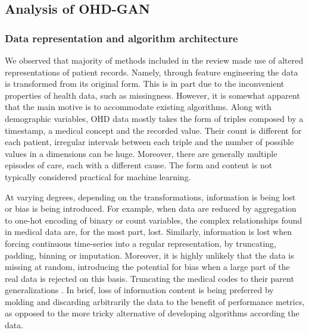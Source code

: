 \subsection{Analysis of OHD-GAN}
\subsubsection{Data representation and algorithm architecture}
We observed that majority of methods included in the review made use of  altered representations of patient records. Namely, through feature engineering the data is transformed from its original form. This is in part due to the inconvenient properties of health data, such as missingness. However, it is somewhat apparent that the main motive is to accommodate existing algorithms. Along with demographic variables, OHD data mostly takes the form of triples composed by a timestamp, a medical concept and the recorded value. Their count is different for each patient, irregular intervals between each triple and the number of possible values in a dimensions can be huge. Moreover, there are generally multiple episodes of care, each with a different cause. The form and content is not typically considered practical for machine learning. \par
At varying degrees, depending on the transformations, information is being lost or bias is being  introduced. For example, when data are reduced by aggregation to one-hot encoding of binary or count variables, the complex relationships found in medical data are, for the most part, lost. Similarly, information is lost when forcing continuous time-series into a regular representation, by truncating, padding, binning or imputation. Moreover, it is highly unlikely that the data is missing at random, introducing the potential for bias when a large part of the real data is rejected on this basis. Truncating the medical codes to their parent generalizations \cite{Zhang2020, Choi2017-nt}.  In brief, loss of information content is being preferred by molding and discarding arbitrarily the data to the benefit of performance metrics, as opposed to the more tricky alternative of developing algorithms according the data.\par
